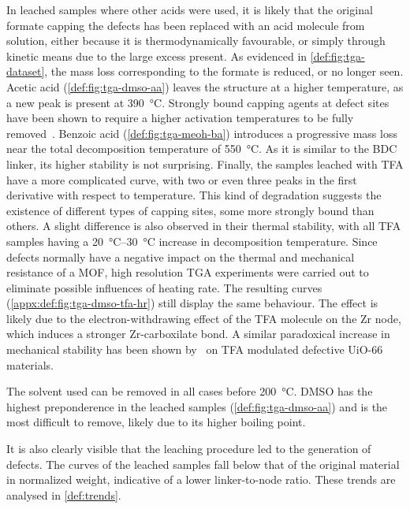 In leached samples where other acids were used,
it is likely that the original formate capping the defects 
has been replaced with an acid molecule from solution,
either because it is thermodynamically favourable, or simply through 
kinetic means due to the large excess present.
As evidenced in \autoref{def:fig:tga-dataset}, the mass 
loss corresponding to the formate is reduced, or no longer seen. 
Acetic acid (\autoref{def:fig:tga-dmso-aa}) leaves the 
structure at a higher temperature, as
a new peak is present at \SI{390}{\degreeCelsius}. Strongly
bound capping agents at defect sites have been shown to 
require a higher activation temperatures to be fully
removed~\cite{jiaoHeatTreatmentDefectiveUiO662017}.
Benzoic acid (\autoref{def:fig:tga-meoh-ba}) introduces a progressive 
mass loss near the total decomposition temperature 
of \SI{550}{\degreeCelsius}.
As it is similar to the \gls{BDC} linker, its higher stability
is not surprising. Finally, the samples leached with 
\gls{TFA} have a more complicated curve, with two or even 
three peaks in the first derivative with respect to temperature.
This kind of degradation suggests the existence of different types
of capping sites, some more strongly bound than others.
A slight difference is also observed in their thermal stability,
with all \gls{TFA} samples having a \SIrange{20}{30}{\degreeCelsius}
increase in decomposition temperature. Since defects normally
have a negative impact on the thermal and mechanical resistance 
of a \gls{MOF}, high resolution \gls{TGA} experiments were carried out
to eliminate possible influences of heating rate. The resulting
curves (\autoref{appx:def:fig:tga-dmso-tfa-hr}) still display 
the same behaviour. The effect is likely due to the
electron-withdrawing effect of the \gls{TFA} molecule on the Zr 
node, which induces a stronger Zr-carboxilate bond. A similar
paradoxical increase in mechanical stability has been shown 
by~\citet{vandevoordeImprovingMechanicalStability2015} on 
\gls{TFA} modulated defective UiO-66 materials.

The solvent used can be removed in all cases before 
\SI{200}{\degreeCelsius}. \gls{DMSO} has the highest
preponderence in the leached samples (\autoref{def:fig:tga-dmso-aa}) 
and is the most difficult to remove, likely due to its higher boiling point.

It is also clearly visible that the leaching procedure
led to the generation of defects. The curves 
of the leached samples fall below that of the original material
in normalized weight, indicative of a lower linker-to-node ratio.
These trends are analysed in \autoref{def:trends}.